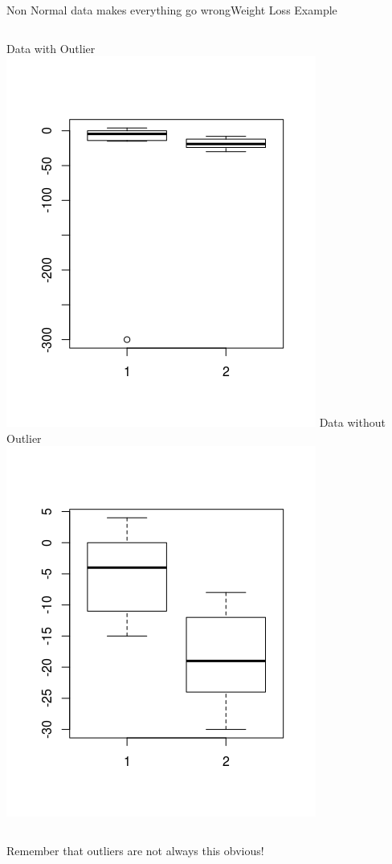 \begin{frame}{Non Normal data makes everything go wrong}{Weight Loss Example}
\begin{columns}
  Data with Outlier\\
  \includegraphics[width=.8\textwidth]{../img/diet_outlier1}
  Data without Outlier\\
  \includegraphics[width=.8\textwidth]{../img/diet_outlier2}
\end{columns}

Remember that outliers are not always this obvious!
\end{frame}


